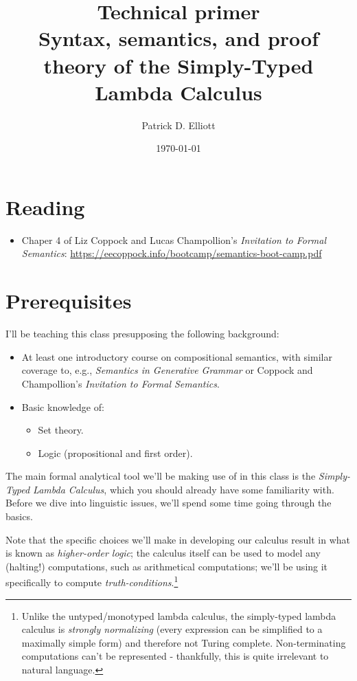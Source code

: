 \documentclass[letterpaper,parskip=half]{scrartcl}
\author{Patrick D. Elliott}
\date{\today}
\title{Technical primer\\\medskip
\large Syntax, semantics, and proof theory of the Simply-Typed Lambda Calculus}
\begin{document}
\maketitle
\tableofcontents


\section{Reading}
\label{sec:org9726fc1}

\begin{itemize}
\item Chaper 4 of Liz Coppock and Lucas Champollion's \emph{Invitation to Formal Semantics}: \url{https://eecoppock.info/bootcamp/semantics-boot-camp.pdf}
\end{itemize}

\section{Prerequisites}
\label{sec:org46e1b89}

I'll be teaching this class presupposing the following background:

\begin{itemize}
\item At least one introductory course on compositional semantics, with similar coverage to, e.g., \emph{Semantics in Generative Grammar} \autocite{HeimKratzer1998} or Coppock and Champollion's \emph{Invitation to Formal Semantics}.
\item Basic knowledge of:
\begin{itemize}
\item Set theory.
\item Logic (propositional and first order).
\end{itemize}
\end{itemize}

The main formal analytical tool we'll be making use of in this class is the \emph{Simply-Typed Lambda Calculus}, which you should already have some familiarity with. Before we dive into linguistic issues, we'll spend some time going through the basics.

Note that the specific choices we'll make in developing our calculus result in what is known as \emph{higher-order logic}; the calculus itself can be used to model any (halting!) computations, such as arithmetical computations; we'll be using it specifically to compute \emph{truth-conditions}.\footnote{Unlike the untyped/monotyped lambda calculus, the simply-typed lambda calculus is \emph{strongly normalizing} (every expression can be simplified to a maximally simple form) and therefore not Turing complete. Non-terminating computations can't be represented - thankfully, this is quite irrelevant to natural language.} 
\end{document}
